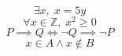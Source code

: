 \[
  \exists x, \; x = 5y
\]
\[
  \forall x \in \mathbb{Z}, \; x^{2} \geq 0
\]
\[
  P \implies Q \iff \neg Q \implies \neg P
\]
\[
  x \in A \land x \notin B
\]